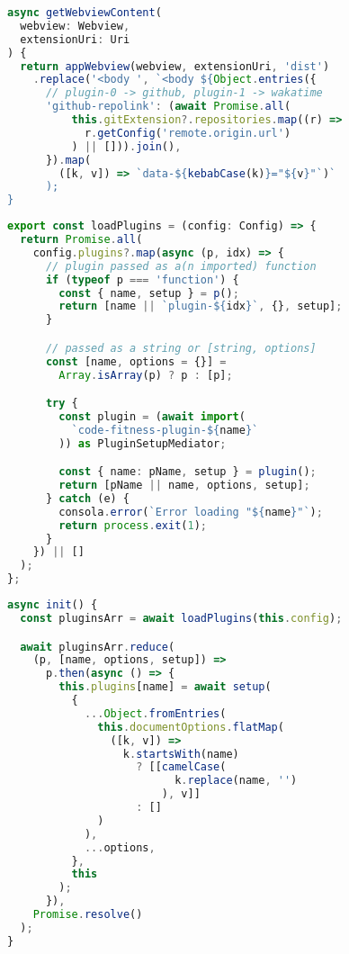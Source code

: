 



\begin{figure}%
	\centering
	\begin{lstlisting}[language=typescript]
async getWebviewContent(
  webview: Webview,
  extensionUri: Uri
) {
  return appWebview(webview, extensionUri, 'dist')
    .replace('<body ', `<body ${Object.entries({
      // plugin-0 -> github, plugin-1 -> wakatime
      'github-repolink': (await Promise.all(
          this.gitExtension?.repositories.map((r) =>
            r.getConfig('remote.origin.url')
          ) || [])).join(),
      }).map(
        ([k, v]) => `data-${kebabCase(k)}="${v}"`)`
      );
}
	\end{lstlisting}
	\caption{}
	\label{code:getWebviewContent}
\end{figure}

\begin{figure}%
	\centering
	\begin{lstlisting}[language=typescript]
export const loadPlugins = (config: Config) => {
  return Promise.all(
    config.plugins?.map(async (p, idx) => {
      // plugin passed as a(n imported) function
      if (typeof p === 'function') {
        const { name, setup } = p();
        return [name || `plugin-${idx}`, {}, setup];
      }

      // passed as a string or [string, options]
      const [name, options = {}] =
        Array.isArray(p) ? p : [p];

      try {
        const plugin = (await import(
          `code-fitness-plugin-${name}`
        )) as PluginSetupMediator;

        const { name: pName, setup } = plugin();
        return [pName || name, options, setup];
      } catch (e) {
        consola.error(`Error loading "${name}"`);
        return process.exit(1);
      }
    }) || []
  );
};
	\end{lstlisting}
	\caption{}
	\label{code:loadPlugins}
\end{figure}

\begin{figure}%
	\centering
	\begin{lstlisting}[language=typescript]
async init() {
  const pluginsArr = await loadPlugins(this.config);

  await pluginsArr.reduce(
    (p, [name, options, setup]) =>
      p.then(async () => {
        this.plugins[name] = await setup(
          {
            ...Object.fromEntries(
              this.documentOptions.flatMap(
                ([k, v]) =>
                  k.startsWith(name)
                    ? [[camelCase(
                          k.replace(name, '')
                        ), v]]
                    : []
              )
            ),
            ...options,
          },
          this
        );
      }),
    Promise.resolve()
  );
}
	\end{lstlisting}
	\caption{}
	\label{code:init}
\end{figure}

